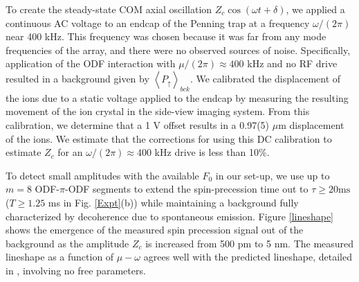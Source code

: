 \documentclass[aps,prl,twocolumn,superscriptaddress,floatfix]{revtex4-1}
\begin{document}
To create the steady-state COM axial oscillation $Z_c \cos(\omega t+\delta)$, we applied a continuous AC voltage to an endcap of the Penning trap at a frequency $\omega/(2\pi)$ near 400 kHz. This frequency was chosen because it was far from any mode frequencies of the array, and there were no observed sources of noise. Specifically, application of the ODF interaction with $\mu/(2\pi) \approx 400$ kHz and no RF drive resulted in a background given by $\left\langle P_{\uparrow}\right\rangle _{bck}$. We calibrated the displacement of the ions due to a static voltage applied to the endcap by measuring the resulting movement of the ion crystal in the side-view imaging system. From this calibration, we determine that a 1 V offset results in a 0.97(5) $\mu$m displacement of the ions. We estimate that the corrections for using this DC calibration to estimate $Z_c$ for an $\omega/(2\pi) \approx 400$ kHz drive is less than 10$\%$.


To detect small amplitudes with the available $F_0$ in our set-up, we use up to $m = 8$ ODF-$\pi$-ODF segments to extend the spin-precession time out to $\tau \ge 20 \mathrm{ms}$ ($T \ge 1.25$ ms in Fig. \ref{Expt}(b)) while maintaining a background fully characterized by decoherence due to spontaneous emission. Figure \ref{lineshape} shows the emergence of the measured spin precession signal out of the background as the amplitude $Z_c$ is increased from 500 pm to 5 nm. The measured lineshape as a function of $\mu-\omega$ agrees well with the predicted lineshape, detailed in \citep{SuppMat}, involving no free parameters.
\end{document}
